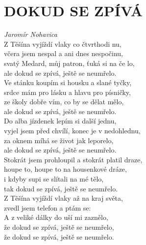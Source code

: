 \section*{\Huge DOKUD SE ZPÍVÁ}
\emph{Jaromír Nohavica}\\

Z Těšína vyjíždí vlaky co čtvrthodi nu,\\
včera jsem nespal a ani dnes nespočinu, \\
svatý Medard, můj patron, ťuká si na če \hspace{0.5cm} lo,\\
ale dokud se zpívá, ještě se neumřelo.\\

Ve stánku koupím si housku a slané tyčky,\\
srdce mám pro lásku a hlavu pro písničky,\\
ze školy dobře vím, co by se dělat mělo,\\
ale dokud se zpívá, ještě se neumřelo.\\

Do alba jízdenek lepím si další jednu,\\
vyjel jsem před chvílí, konec je v nedohlednu,\\
za oknem míhá se život jak leporelo,\\
ale dokud se zpívá, ještě se neumřelo.\\

Stokrát jsem prohloupil a stokrát platil draze,\\
houpe to, houpe to na housenkové dráze,\\
i kdyby supi se slítali na mé tělo,\\
tak dokud se zpívá, ještě se neumřelo.\\

Z Těšína vyjíždí vlaky až na kraj světa,\\
zvedl jsem telefon a ptám se: \\
A z veliké dálky do uší mi zaznělo,\\
že dokud se zpívá, ještě se neumřelo,\\
že dokud se zpívá, ještě se neumřelo.

\newpage
